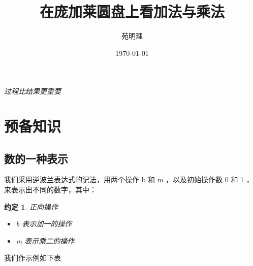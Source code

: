 \documentclass[a4paper,12pt]{article}
\title{在庞加莱圆盘上看加法与乘法}
\author{苑明理}
\date{\monthyeardate\today}
\newtheorem{convention}{约定}
\begin{document}
\begin{center}
  \sihao \em 过程比结果更重要
\end{center}

\begingroup
\let\newpage\relax
\maketitle
\endgroup

\renewcommand\contentsname{目录}
\setcounter{tocdepth}{2}
\tableofcontents

\newpage

\section{预备知识}

\subsection{数的一种表示}

我们采用逆波兰表达式的记法，用两个操作 b 和 m ，以及初始操作数 0 和 1 ，来表示出不同的数字，其中：

\begin{convention}
正向操作
\begin{itemize}
\item b 表示加一的操作
\item m 表示乘二的操作
\end{itemize}
\end{convention}

我们作示例如下表
\end{document}
